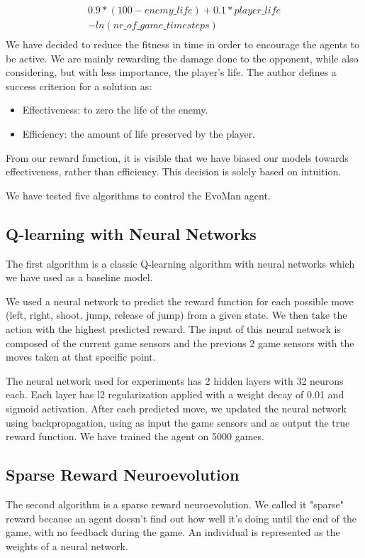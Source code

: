 \documentclass[conference]{IEEEtran}
\begin{document}
\boldmath
\begin{gather*}
    0.9 * (100 - enemy\_life) + 0.1 * player\_life\\
    - ln(nr\_of\_game\_timesteps)\\
\end{gather*}
\unboldmath
We have decided to reduce the fitness in time in order to encourage the agents to be active.
We are mainly rewarding the damage done to the opponent, while also considering, but with less importance,
the player's life.
\newpage
The author defines a success criterion for a solution as:
\begin{itemize}
    \item Effectiveness: to zero the life of the enemy.
    \item Efficiency: the amount of life preserved by the player.
\end{itemize}
From our reward function, it is visible that we have biased our models towards effectiveness,
rather than efficiency.
This decision is solely based on intuition.

We have tested five algorithms to control the EvoMan agent.

\subsection{Q-learning with Neural Networks}\label{subsec:q-learning-with-neural-network}
The first algorithm is a classic Q-learning\cite{q_learning} algorithm with neural networks which we have used
as a baseline model.

We used a neural network to predict the reward function for each possible move
(left, right, shoot, jump, release of jump) from a given state.
We then take the action with the highest predicted reward.
The input of this neural network is composed of the current game sensors and the
previous 2 game sensors with the moves taken at that specific point.

The neural network used for experiments has 2 hidden layers with 32 neurons each.
Each layer has l2 regularization applied with a weight decay of 0.01 and sigmoid activation.
After each predicted move, we updated the neural network using backpropagation,
using as input the game sensors and as output the true reward function.
We have trained the agent on 5000 games.

\subsection{Sparse Reward Neuroevolution}\label{subsec:sparse-reward-neuroevolution}
The second algorithm is a sparse reward neuroevolution\cite{neuro}.
We called it "sparse" reward because an agent doesn't find out how well it's doing until
the end of the game, with no feedback during the game.
An individual is represented as the weights of a neural network.
\end{document}
